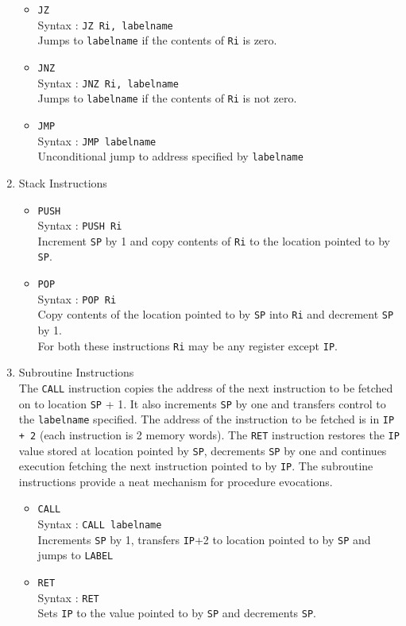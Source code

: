 \documentclass[11pt]{report}
\begin{document}
\begin{enumerate}
\begin{itemize}
\item \texttt{JZ}\\
Syntax : \texttt{JZ Ri, labelname}\\
Jumps to \texttt{labelname} if the contents of \texttt{Ri} is zero.
\item \texttt{JNZ}\\
Syntax : \texttt{JNZ Ri, labelname}\\
Jumps to \texttt{labelname} if the contents of \texttt{Ri} is not zero.
\item \texttt{JMP}\\
Syntax : \texttt{JMP labelname}\\
Unconditional jump to address specified by \texttt{labelname}\\

\end{itemize}

\item Stack Instructions
\begin{itemize}
\item \texttt{PUSH}\\
Syntax : \texttt{PUSH Ri}\\
Increment \texttt{SP} by 1 and copy contents of \texttt{Ri} to the location pointed to by \texttt{SP}.
\item \texttt{POP}\\
Syntax : \texttt{POP Ri}\\
Copy contents of the location pointed to by \texttt{SP} into \texttt{Ri} and decrement \texttt{SP} by 1.\\
For both these instructions \texttt{Ri} may be any register except \texttt{IP}.
\end{itemize}

\item Subroutine Instructions\\
The \texttt{CALL} instruction copies the address of the next instruction to be fetched on to location \texttt{SP} + 1. It also increments \texttt{SP} by one and transfers control to the \texttt{labelname} specified. The address of the instruction to be fetched is in \texttt{IP + 2} (each instruction is 2 memory words). The \texttt{RET} instruction restores the \texttt{IP} value stored at location pointed by \texttt{SP}, decrements \texttt{SP} by one and continues execution fetching the next instruction pointed to by \texttt{IP}. The subroutine instructions provide a neat mechanism for procedure evocations.
\begin{itemize}
\item \texttt{CALL}\\
Syntax : \texttt{CALL labelname}\\
Increments \texttt{SP} by 1, transfers \texttt{IP}+2 to location pointed to by \texttt{SP} and jumps to \texttt{LABEL}
\item \texttt{RET}\\
Syntax : \texttt{RET}\\
Sets \texttt{IP} to the value pointed to by \texttt{SP} and decrements \texttt{SP}.
\end{itemize}


\end{enumerate}
\end{document}
